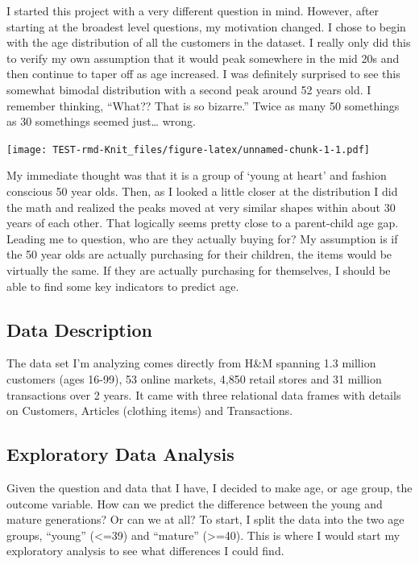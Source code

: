 \documentclass[
]{article}
\begin{document}
I started this project with a very different question in mind. However,
after starting at the broadest level questions, my motivation changed. I
chose to begin with the age distribution of all the customers in the
dataset. I really only did this to verify my own assumption that it
would peak somewhere in the mid 20s and then continue to taper off as
age increased. I was definitely surprised to see this somewhat bimodal
distribution with a second peak around 52 years old. I remember
thinking, ``What?? That is so bizarre.'' Twice as many 50 somethings as
30 somethings seemed just\ldots{} wrong.

\texttt{[image: TEST-rmd-Knit\_files/figure-latex/unnamed-chunk-1-1.pdf]}

My immediate thought was that it is a group of `young at heart' and
fashion conscious 50 year olds. Then, as I looked a little closer at the
distribution I did the math and realized the peaks moved at very similar
shapes within about 30 years of each other. That logically seems pretty
close to a parent-child age gap. Leading me to question, who are they
actually buying for? My assumption is if the 50 year olds are actually
purchasing for their children, the items would be virtually the same. If
they are actually purchasing for themselves, I should be able to find
some key indicators to predict age.

\hypertarget{data-description}{%
\subsection{Data Description}\label{data-description}}

The data set I'm analyzing comes directly from H\&M spanning 1.3 million
customers (ages 16-99), 53 online markets, 4,850 retail stores and 31
million transactions over 2 years. It came with three relational data
frames with details on Customers, Articles (clothing items) and
Transactions.

\hypertarget{exploratory-data-analysis}{%
\subsection{Exploratory Data Analysis}\label{exploratory-data-analysis}}

Given the question and data that I have, I decided to make age, or age
group, the outcome variable. How can we predict the difference between
the young and mature generations? Or can we at all? To start, I split
the data into the two age groups, ``young'' (\textless=39) and
``mature'' (\textgreater=40). This is where I would start my exploratory
analysis to see what differences I could find.
\end{document}
